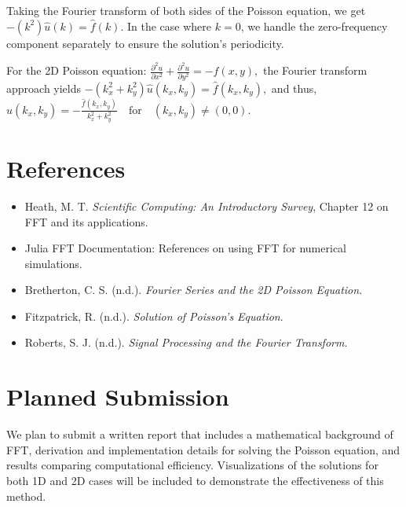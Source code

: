 \documentclass[11pt]{article}
\begin{document}
Taking the Fourier transform of both sides of the Poisson equation, we get
\(
-(k^2) \hat{u}(k) = \hat{f}(k).
\)
In the case where \( k = 0 \), we handle the zero-frequency component separately to ensure the solution's periodicity.

For the 2D Poisson equation:
\(
\frac{\partial^2 u}{\partial x^2} + \frac{\partial^2 u}{\partial y^2} = -f(x, y),
\)
the Fourier transform approach yields
\(
-(k_x^2 + k_y^2) \hat{u}(k_x, k_y) = \hat{f}(k_x, k_y),
\)
and thus,
\(
\hat{u}(k_x, k_y) = -\frac{\hat{f}(k_x, k_y)}{k_x^2 + k_y^2} \quad \text{for} \quad (k_x, k_y) \neq (0, 0).
\)

\section*{References}
\begin{itemize}
    \item Heath, M. T. \textit{Scientific Computing: An Introductory Survey}, Chapter 12 on FFT and its applications.
    \item Julia FFT Documentation: References on using FFT for numerical simulations.
    \item Bretherton, C. S. (n.d.). \textit{Fourier Series and the 2D Poisson Equation}. 
    \item Fitzpatrick, R. (n.d.). \textit{Solution of Poisson's Equation}. 
    \item Roberts, S. J. (n.d.). \textit{Signal Processing and the Fourier Transform}. 
\end{itemize}


\section*{Planned Submission}
We plan to submit a written report that includes a mathematical background of FFT, derivation and implementation details for solving the Poisson equation, and results comparing computational efficiency. 
Visualizations of the solutions for both 1D and 2D cases will be included to demonstrate the effectiveness of this method.
\end{document}
